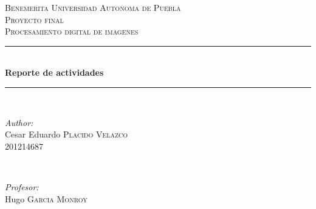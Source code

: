 \documentclass[12pt]{article}
\begin{document}
\begin{titlepage}

\newcommand{\HRule}{\rule{\linewidth}{0.5mm}} %

\center %
 

\textsc{\LARGE Benemerita Universidad Autonoma de Puebla}\\[1.5cm] %
\textsc{\Large Proyecto final}\\[0.5cm] %
\textsc{\large Procesamiento digital de imagenes}\\[0.5cm] %


\HRule \\[0.4cm]
{ \huge \bfseries Reporte de actividades}\\[0.4cm] %
\HRule \\[1cm]
 

\begin{minipage}{0.4\textwidth}
\begin{flushleft} \large
\emph{Author:}\\
Cesar Eduardo \textsc{Placido Velazco\\201214687} %
\end{flushleft}
\end{minipage}
~
\begin{minipage}{0.4\textwidth}
\begin{flushright} \large
\emph{Profesor:} \\
 Hugo \textsc{Garcia Monroy} %
\end{flushright}
\end{minipage}\\ [1cm]


\end{titlepage}
\end{document}

